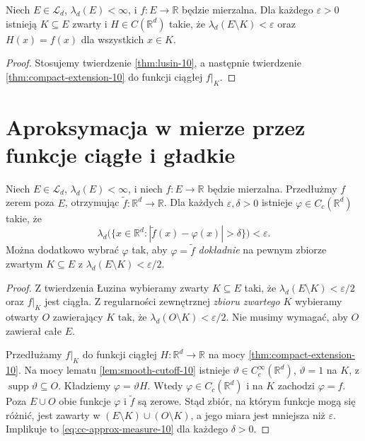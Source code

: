 \begin{wniosek}
\label{cor:lusin-extension-10}
Niech $E\in\mathcal L_d$, $\lambda_d(E)<\infty$,
i $f:E\to\mathbb R$ będzie mierzalna. Dla każdego
$\varepsilon>0$ istnieją $K\subseteq E$ zwarty
i $H\in C(\mathbb R^d)$ takie, że
$\lambda_d(E\setminus K)<\varepsilon$ oraz
$H(x)=f(x)$ dla wszystkich $x\in K$.
\end{wniosek}
\begin{proof}
Stosujemy twierdzenie \ref{thm:lusin-10},
a następnie twierdzenie \ref{thm:compact-extension-10}
do funkcji ciągłej $f|_K$.
\end{proof}

\section{Aproksymacja w mierze przez funkcje ciągłe i gładkie}

\begin{twierdzenie}
\label{thm:cc-approx-in-measure-10}
Niech $E\in\mathcal L_d$, $\lambda_d(E)<\infty$,
i niech $f:E\to\mathbb R$ będzie mierzalna.
Przedłużmy $f$ zerem poza $E$, otrzymując
$\widetilde f:\mathbb R^d\to\mathbb R$.
Dla każdych $\varepsilon,\delta>0$ istnieje
$\varphi\in C_c(\mathbb R^d)$ takie, że
\begin{equation}\label{eq:cc-approx-measure-10}
\lambda_d\bigl(\{x\in\mathbb R^d:
|\widetilde f(x)-\varphi(x)|>\delta\}\bigr)
<\varepsilon.
\end{equation}
Można dodatkowo wybrać $\varphi$ tak, aby
$\varphi=\widetilde f$ \emph{dokładnie} na pewnym
zbiorze zwartym $K\subseteq E$ z
$\lambda_d(E\setminus K)<\varepsilon/2$.
\end{twierdzenie}
\begin{proof}
Z twierdzenia Łuzina wybieramy zwarty
$K\subseteq E$ taki, że
$\lambda_d(E\setminus K)<\varepsilon/2$
oraz $f|_K$ jest ciągła.
Z regularności zewnętrznej \emph{zbioru zwartego}
$K$ wybieramy otwarty $O$ zawierający $K$ tak,
że $\lambda_d(O\setminus K)<\varepsilon/2$.
Nie musimy wymagać, aby $O$ zawierał całe $E$.

Przedłużamy $f|_K$ do funkcji ciągłej
$H:\mathbb R^d\to\mathbb R$ na mocy
\ref{thm:compact-extension-10}. Na mocy lematu
\ref{lem:smooth-cutoff-10} istnieje
$\vartheta\in C_c^\infty(\mathbb R^d)$, $\vartheta=1$ na $K$,
z $\operatorname{supp}\vartheta\subseteq O$.
Kładziemy $\varphi=\vartheta H$. Wtedy
$\varphi\in C_c(\mathbb R^d)$ i na $K$ zachodzi
$\varphi=f$. Poza $E\cup O$ obie funkcje
$\varphi$ i $\widetilde f$ są zerowe. Stąd
zbiór, na którym funkcje mogą się różnić,
jest zawarty w $(E\setminus K)\cup(O\setminus K)$,
a jego miara jest mniejsza niż $\varepsilon$.
Implikuje to \eqref{eq:cc-approx-measure-10}
dla każdego $\delta>0$.
\end{proof}

